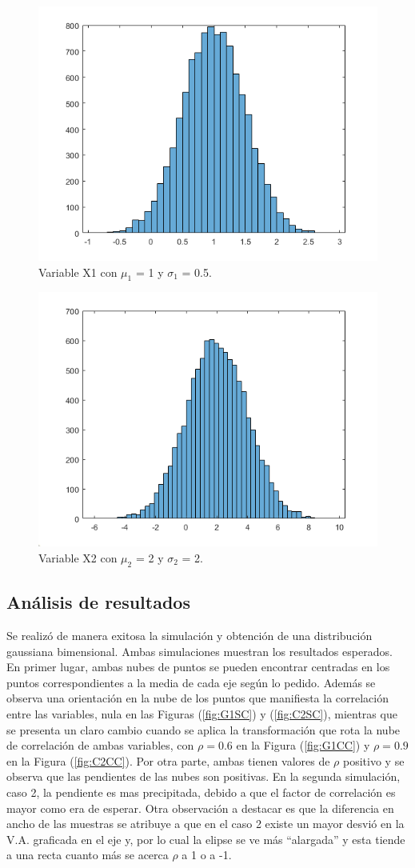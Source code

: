 \begin{figure}[H]
	\centering
	\includegraphics[width=0.5\linewidth]{./ImagenesEjercicio2/X1b.PNG}
	\caption{Variable X1 con $\mu_1$ = 1 y $\sigma_1$ = 0.5.}
	\label{fig:X1b}
\end{figure}
\begin{figure}[H]
	\centering
	\includegraphics[width=0.5\linewidth]{./ImagenesEjercicio2/X2b.PNG}
	\caption{Variable X2 con $\mu_2$ = 2 y $\sigma_2$ = 2.}
	\label{fig:X2b}
\end{figure}

\subsection*{Análisis de resultados}

Se realizó de manera exitosa la simulación y obtención de una distribución gaussiana bimensional. Ambas simulaciones muestran los resultados esperados. En primer lugar, ambas nubes de puntos se pueden encontrar centradas en los puntos correspondientes a la media de cada eje según lo pedido.
Además se observa una orientación en la nube de los puntos que manifiesta la correlación entre las variables, nula en las Figuras (\ref{fig:G1SC}) y (\ref{fig:C2SC}), mientras que se presenta un claro cambio cuando se aplica la transformación que rota la nube de correlación de ambas variables, con $\rho=0.6$ en la Figura (\ref{fig:G1CC}) y $\rho= 0.9$ en la Figura (\ref{fig:C2CC}).
Por otra parte, ambas tienen valores de $\rho$ positivo y se observa que las pendientes de las nubes son positivas. En la segunda simulación, caso 2, la pendiente es mas precipitada, debido a que el factor de correlación es mayor como era de esperar.
Otra observación a destacar es que la diferencia en ancho de las muestras se atribuye a que en el caso 2 existe un mayor desvió en la V.A. graficada en el eje y, por lo cual la elipse se ve más ``alargada'' y esta tiende a una recta cuanto más se acerca $\rho$ a 1 o a -1.
